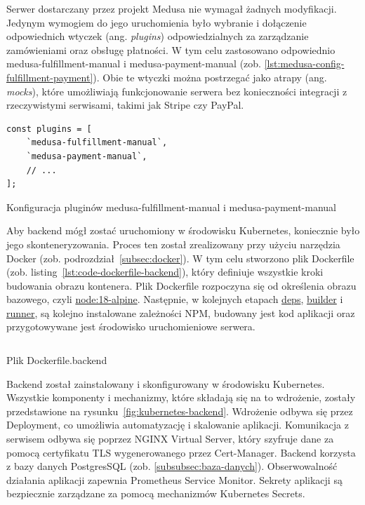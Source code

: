 Serwer dostarczany przez projekt Medusa nie wymagał żadnych modyfikacji.
Jedynym wymogiem do jego uruchomienia było wybranie i dołączenie odpowiednich wtyczek (ang. \emph{plugins}) odpowiedzialnych za zarządzanie zamówieniami oraz obsługę płatności.
W tym celu zastosowano odpowiednio medusa-fulfillment-manual  i medusa-payment-manual (zob. \autoref{lst:medusa-config-fulfillment-payment}).
Obie te wtyczki można postrzegać jako atrapy (ang. \emph{mocks}), które umożliwiają funkcjonowanie serwera bez konieczności integracji z rzeczywistymi serwisami, takimi jak Stripe czy PayPal.

\begin{listing}[H]
    \begin{verbatim}
const plugins = [
    `medusa-fulfillment-manual`,
    `medusa-payment-manual`,
    // ...
];
    \end{verbatim}
    \caption{Konfiguracja pluginów medusa-fulfillment-manual i medusa-payment-manual}
    \label{lst:medusa-config-fulfillment-payment}
\end{listing}

Aby backend mógł zostać uruchomiony w środowisku Kubernetes, koniecznie było jego skonteneryzowania.
Proces ten został zrealizowany przy użyciu narzędzia Docker (zob. podrozdział~\ref{subsec:docker}).
W tym celu stworzono plik Dockerfile (zob. listing~\ref{lst:code-dockerfile-backend}), który definiuje wszystkie kroki budowania obrazu kontenera.
Plik Dockerfile rozpoczyna się od określenia obrazu bazowego, czyli \url{node:18-alpine}.
Następnie, w kolejnych etapach \url{deps}, \url{builder} i \url{runner}, są kolejno instalowane zależności NPM, budowany jest kod aplikacji oraz przygotowywane jest środowisko uruchomieniowe serwera.

\begin{listing}[H]
    \inputminted[xleftmargin=20pt,linenos]{docker}{code/Dockerfile.backend}
    \caption{Plik Dockerfile.backend}
    \label{lst:code-dockerfile-backend}
\end{listing}

Backend został zainstalowany i skonfigurowany w środowisku Kubernetes.
Wszystkie komponenty i mechanizmy, które składają się na to wdrożenie, zostały przedstawione na rysunku~\ref{fig:kubernetes-backend}.
Wdrożenie odbywa się przez Deployment, co umożliwia automatyzację i skalowanie aplikacji.
Komunikacja z serwisem odbywa się poprzez NGINX Virtual Server, który szyfruje dane za pomocą certyfikatu TLS wygenerowanego przez Cert-Manager.
Backend korzysta z bazy danych PostgresSQL (zob. \autoref{subsubsec:baza-danych}).
Obserwowalność działania aplikacji zapewnia Prometheus Service Monitor.
Sekrety aplikacji są bezpiecznie zarządzane za pomocą mechanizmów Kubernetes Secrets.


